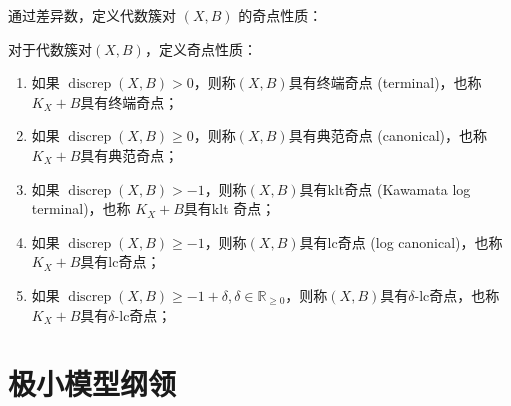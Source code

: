 通过差异数，定义代数簇对 $(X,B)$ 的奇点性质：
\begin{definition}
  对于代数簇对$(X,B)$，定义奇点性质：
  \begin{enumerate}
    \item 如果 $\operatorname{discrep}(X,B)>0$，则称$(X,B) $具有终端奇点 (terminal)，也称 $K_{X}+B$具有终端奇点； 
    \item 如果 $\operatorname{discrep}(X,B)\geqslant 0$，则称$(X,B) $具有典范奇点 (canonical)，也称 $K_{X}+B$具有典范奇点； 
    \item 如果 $\operatorname{discrep}(X,B)>-1$，则称$(X,B) $具有klt奇点 (Kawamata log terminal)，也称 $K_{X}+B$具有klt 奇点； 
    \item 如果 $\operatorname{discrep}(X,B)\geqslant -1$，则称$(X,B) $具有lc奇点 (log canonical)，也称 $K_{X}+B$具有lc奇点； 
    \item 如果 $\operatorname{discrep}(X,B)\geqslant -1+\delta,\delta \in \mathbb{R}_{\geqslant 0}$，则称$(X,B) $具有$\delta$-lc奇点，也称 $K_{X}+B$具有$\delta$-lc奇点； 
  \end{enumerate}
\end{definition}

\section{极小模型纲领}

